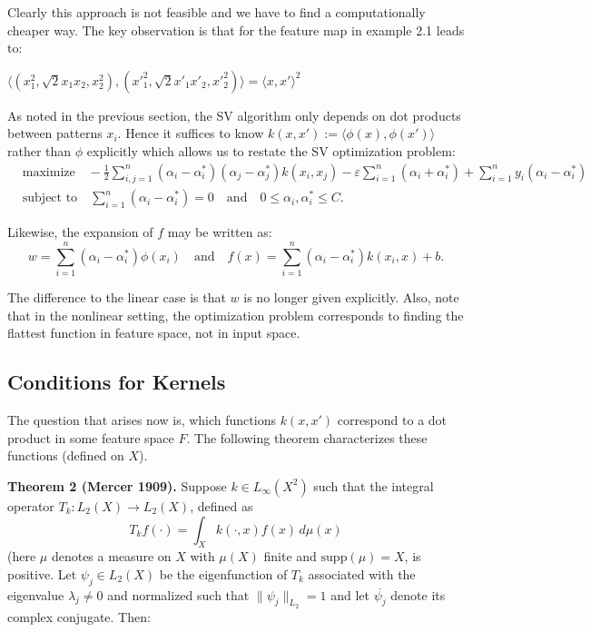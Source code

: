 \documentclass[fleqn,10pt]{olplainarticle}
\begin{document}
Clearly this approach is not feasible and we have to find a computationally cheaper way. The key observation is that for the feature map in example 2.1 leads to:

\(\langle (x_1^2, \sqrt{2}x_1x_2, x_2^2), (x'_1^2, \sqrt{2}x'_1x'_2, x'_2^2) \rangle = \langle x, x' \rangle^2\)

As noted in the previous section, the SV algorithm only depends on dot products between patterns \(x_i\). Hence it suffices to know \(k(x, x') := \langle \phi(x), \phi(x') \rangle\) rather than \(\phi\) explicitly which allows us to restate the SV optimization problem:
\[
\begin{aligned}
&\text{maximize} \quad -\frac{1}{2} \sum_{i, j=1}^{n} (\alpha_i - \alpha_i^*)(\alpha_j - \alpha_j^*) k(x_i, x_j) - \varepsilon \sum_{i=1}^{n} (\alpha_i + \alpha_i^*) + \sum_{i=1}^{n} y_i (\alpha_i - \alpha_i^*) \\
&\text{subject to} \quad \sum_{i=1}^{n} (\alpha_i - \alpha_i^*) = 0 \quad \text{and} \quad 0 \leq \alpha_i, \alpha_i^* \leq C.
\end{aligned}
\]

Likewise, the expansion of \(f\) may be written as:
\[
w = \sum_{i=1}^{n} (\alpha_i - \alpha_i^*) \phi(x_i) \quad \text{and} \quad f(x) = \sum_{i=1}^{n} (\alpha_i - \alpha_i^*) k(x_i, x) + b.
\]

The difference to the linear case is that \(w\) is no longer given explicitly. Also, note that in the nonlinear setting, the optimization problem corresponds to finding the flattest function in feature space, not in input space.

\subsection{Conditions for Kernels}

The question that arises now is, which functions \(k(x, x')\) correspond to a dot product in some feature space \(F\). The following theorem characterizes these functions (defined on \(X\)).

\textbf{Theorem 2 (Mercer 1909).} Suppose \(k \in L_{\infty}(X^2)\) such that the integral operator \(T_k : L_2(X) \rightarrow L_2(X)\), defined as 
\[
T_k f(\cdot) = \int_X k(\cdot, x) f(x) \, d\mu(x)
\]
(here \(\mu\) denotes a measure on \(X\) with \(\mu(X)\) finite and \(\text{supp}(\mu) = X\), is positive. Let \(\psi_j \in L_2(X)\) be the eigenfunction of \(T_k\) associated with the eigenvalue \(\lambda_j \neq 0\) and normalized such that \(\|\psi_j\|_{L_2} = 1\) and let \(\overline{\psi_j}\) denote its complex conjugate. Then:
\end{document}
